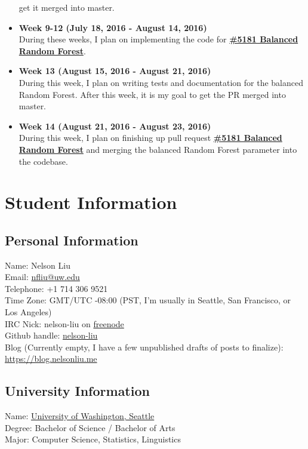\documentclass[12pt, oneside]{article}
\begin{document}
\begin{itemize}
  get it merged into master.
  \item 
  \textbf{Week 9-12 (July 18, 2016 - August 14, 2016)}\\
  During these weeks, I plan on implementing the code for
  \textbf{\href{https://github.com/scikit-learn/scikit-learn/pull/5181}
    {\#5181 Balanced Random Forest}}.
  \item
  \textbf{Week 13 (August 15, 2016 - August 21, 2016)}\\
  During this week, I plan on writing tests and documentation for the
  balanced Random Forest. After this week, it is my goal to get the PR
  merged into master.
  \item
  \textbf{Week 14 (August 21, 2016 - August 23, 2016)}\\
  During this week, I plan on finishing up pull request
  \textbf{\href{https://github.com/scikit-learn/scikit-learn/pull/5181}
    {\#5181 Balanced Random Forest}} and merging the balanced Random
  Forest parameter into the codebase.
\end{itemize}
\section{Student Information}
\subsection{Personal Information}
Name: Nelson Liu\\
Email: \href{mailto:nfliu@uw.edu}{nfliu@uw.edu}\\
Telephone: +1 714 306 9521\\
Time Zone: GMT/UTC -08:00 (PST, I'm usually in Seattle, San Francisco,
or Los Angeles)\\
IRC Nick: nelson-liu on \href{https://webchat.freenode.net/}{freenode}\\
Github handle: \href{https://github.com/nelson-liu}{nelson-liu}\\
Blog (Currently empty, I have a few unpublished drafts of posts to finalize):
\href{http://blog.nelsonliu.me}{https://blog.nelsonliu.me}\\
\subsection{University Information}
Name: \href{http://www.washington.edu/}{University of Washington, Seattle}\\
Degree: Bachelor of Science / Bachelor of Arts\\
Major: Computer Science, Statistics, Linguistics
\end{document}
